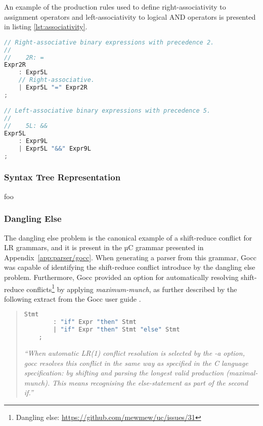An example of the production rules used to define right-associativity to assignment operators and left-associativity to logical AND operators is presented in listing \ref{lst:associativity}.

\begin{lstlisting}[language=go,style=go,caption={\label{lst:associativity}Associativity of binary expressions.}]
// Right-associative binary expressions with precedence 2.
//
//    2R: =
Expr2R
	: Expr5L
	// Right-associative.
	| Expr5L "=" Expr2R
;

// Left-associative binary expressions with precedence 5.
//
//    5L: &&
Expr5L
	: Expr9L
	| Expr5L "&&" Expr9L
;
\end{lstlisting}

\subsubsection{Syntax Tree Representation}



foo

\subsubsection{Dangling Else}

The dangling else problem is the canonical example of a shift-reduce conflict for LR grammars, and it is present in the µC grammar presented in Appendix~\ref{app:parser/gocc}. When generating a parser from this grammar, Gocc was capable of identifying the shift-reduce conflict introduce by the dangling else problem. Furthermore, Gocc provided an option for automatically resolving shift-reduce conflicts\footnote{Dangling else: \url{https://github.com/mewmew/uc/issues/31}} by applying \textit{maximum-munch}, as further described by the following extract from the Gocc user guide \cite{gocc_user_guide}.

\begin{quote}
	\begin{lstlisting}[language=go,style=go,caption={Grammar with shift-reduce conflict.}]
	Stmt
		: "if" Expr "then" Stmt
		| "if" Expr "then" Stmt "else" Stmt
	;
	\end{lstlisting}

	\textit{``When automatic LR(1) conflict resolution is selected by the -a option, gocc resolves this conflict in the same way as specified in the C language specification: by shifting and parsing the longest valid production (maximal-munch). This means recognising the else-statement as part of the second if.''}
\end{quote}
